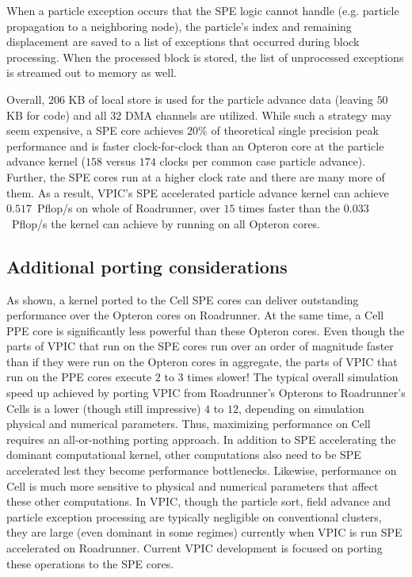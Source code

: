 \documentclass[letter,10pt]{article}
\begin{document}
When a particle exception occurs that the SPE logic cannot handle
(e.g. particle propagation to a neighboring node), the
particle's index and remaining displacement are saved to a list of
exceptions that occurred during block processing.  When the processed
block is stored, the list of unprocessed exceptions
is streamed out to memory as well.


Overall, $206$ KB of local store is used for the particle advance data
(leaving $50$ KB for code) and all $32$ DMA channels are utilized.
While such a strategy may seem expensive, a SPE core achieves $20\%$
of theoretical single precision peak performance and is faster
clock-for-clock than an Opteron core at the particle advance kernel
($158$ versus $174$ clocks per common case particle advance).
Further, the SPE cores run at a higher clock rate and there are many
more of them.  As a result, VPIC's SPE accelerated particle advance
kernel can achieve $0.517$~Pflop/s on whole of Roadrunner, over $15$
times faster than the $0.033$~Pflop/s the kernel can achieve by
running on all Opteron cores.

\subsection{Additional porting considerations}

As shown, a kernel ported to the Cell SPE cores can deliver
outstanding performance over the Opteron cores on Roadrunner.  At the
same time, a Cell PPE core is significantly less powerful than these
Opteron cores.  Even though the parts of VPIC that run on the SPE
cores run over an order of magnitude faster than if they were run on
the Opteron cores in aggregate, the parts of VPIC that run on the PPE
cores execute $2$ to $3$ times slower!  The typical overall
simulation speed up achieved by porting VPIC from Roadrunner's
Opterons to Roadrunner's Cells is a lower (though still impressive)
$4$ to $12$, depending on simulation physical and numerical
parameters.  Thus, maximizing performance on Cell requires an
all-or-nothing porting approach.  In addition to SPE accelerating the
dominant computational kernel, other computations also need to be SPE
accelerated lest they become performance bottlenecks.  Likewise,
performance on Cell is much more sensitive to physical and numerical
parameters that affect these other computations.  In VPIC, though the
particle sort, field advance and particle exception processing are
typically negligible on conventional clusters, they are large (even
dominant in some regimes) currently when VPIC is run SPE accelerated
on Roadrunner.  Current VPIC development is focused on porting these
operations to the SPE cores.
\end{document}
